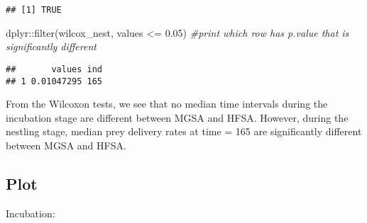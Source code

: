 \documentclass[
]{article}
\newenvironment{Shaded}{\begin{snugshade}}{\end{snugshade}}
\newcommand{\CommentTok}[1]{\textcolor[rgb]{0.56,0.35,0.01}{\textit{#1}}}
\newcommand{\FloatTok}[1]{\textcolor[rgb]{0.00,0.00,0.81}{#1}}
\newcommand{\FunctionTok}[1]{\textcolor[rgb]{0.00,0.00,0.00}{#1}}
\newcommand{\NormalTok}[1]{#1}
\newcommand{\SpecialCharTok}[1]{\textcolor[rgb]{0.00,0.00,0.00}{#1}}
\begin{document}
\begin{Shaded}
\end{Shaded}

\begin{verbatim}
## [1] TRUE
\end{verbatim}

\begin{Shaded}
\begin{Highlighting}[]
\NormalTok{dplyr}\SpecialCharTok{::}\FunctionTok{filter}\NormalTok{(wilcox\_nest, values }\SpecialCharTok{\textless{}=} \FloatTok{0.05}\NormalTok{) }\CommentTok{\#print which row has p.value that is significantly different}
\end{Highlighting}
\end{Shaded}

\begin{verbatim}
##       values ind
## 1 0.01047295 165
\end{verbatim}

From the Wilcoxon tests, we see that no median time intervals during the
incubation stage are different between MGSA and HFSA. However, during
the nestling stage, median prey delivery rates at time = 165 are
significantly different between MGSA and HFSA.

\hypertarget{plot-1}{%
\subsection{Plot}\label{plot-1}}

Incubation:
\end{document}
